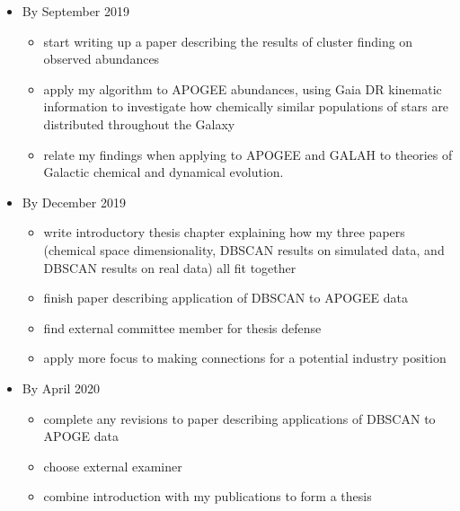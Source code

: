 \documentclass[11pt]{article}
\begin{document}
\begin{itemize}
\item By September 2019
\begin{itemize}
\item {\color{RoyalBlue} start writing up a paper describing the results of cluster finding on observed abundances}
\item {\color{RoyalBlue} apply my algorithm to APOGEE abundances, using Gaia DR kinematic information to investigate how chemically similar populations of stars are distributed throughout the Galaxy}
\item {\color{ForestGreen} relate my findings when applying to APOGEE and GALAH to theories of Galactic chemical and dynamical evolution.}
\end{itemize}
\item By December 2019
\begin{itemize}
\item write introductory thesis chapter explaining how my three papers (chemical space dimensionality, DBSCAN results on simulated data, and DBSCAN results on real data) all fit together
\item {finish paper describing application of DBSCAN to APOGEE data}
\item find external committee member for thesis defense
\item {\color{ForestGreen} apply more focus to making connections for a potential industry position}
\end{itemize}
\item By April 2020
\begin{itemize}
\item complete any revisions to paper describing applications of DBSCAN to APOGE data
\item choose external examiner
\item combine introduction with my publications to form a thesis
\end{itemize}
\end{itemize}
\end{document}
